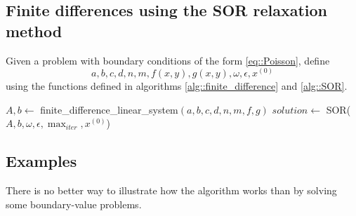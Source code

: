 \documentclass[a4paper]{article}
\begin{document}
\subsection{Finite differences using the SOR relaxation method}
\begin{algorithm}[H]
\caption{Finite difference algorithm using the SOR relaxation method}\label{alg::finite_diff_SOR}
Given a problem with boundary conditions of the form \ref{eq::Poisson}, define
\begin{equation*}
a,b,c,d,n,m,f(x,y),g(x,y),\omega,\epsilon,x^{(0)}
\end{equation*}
using the functions defined in algorithms \ref{alg::finite_difference} and \ref{alg::SOR}.
\begin{algorithmic}
\State $A, b\gets$ finite\_difference\_linear\_system$(a,b,c,d,n,m,f,g)$
\State $solution\gets $ SOR($A,b,\omega,\epsilon,\max_{iter},x^{(0)}$)
\end{algorithmic}
\end{algorithm}

\subsection{Examples}
There is no better way to illustrate how the algorithm works than by solving some boundary-value problems.
\end{document}
